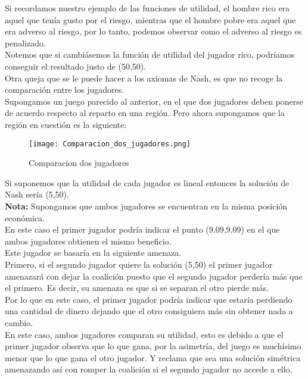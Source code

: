\documentclass[10pt,a4paper]{book}
\begin{document}
Si recordamos nuestro ejemplo de las funciones de utilidad, el hombre rico era aquel que tenía gusto por el riesgo, mientras que el hombre pobre era aquel que era adverso al riesgo, por lo tanto, podemos observar como el adverso al riesgo es penalizado.\\

Notemos que si cambiásemos la función de utilidad del jugador rico, podríamos conseguir el resultado justo de (50,50).\\

Otra queja que se le puede hacer a los axiomas de Nash, es que no recoge la comparación entre los jugadores.\\

Supongamos un juego parecido al anterior, en el que dos jugadores deben ponerse de acuerdo respecto al reparto en una región. Pero ahora supongamos que la región en cuestión es la siguiente:\\


\begin{figure}[htb]
\centering
\texttt{[image: Comparacion\_dos\_jugadores.png]}
\caption{Comparacion dos jugadores}
\end{figure}


	
Si suponemos que la utilidad de cada jugador es lineal entonces la solución de Nash sería (5,50).\\

\textbf{Nota:} Supongamos que ambos jugadores se encuentran en la misma posición económica.\\

En este caso el primer jugador podría indicar el punto (9.09,9.09) en el que ambos jugadores obtienen el mismo beneficio.\\

Este jugador se basaría en la siguiente amenaza. \\
Primero, si el segundo jugador quiere la solución (5,50) el primer jugador amenazará con dejar la coalición puesto que el segundo jugador perdería más que el primero. Es decir, su amenaza es que si se separan el otro pierde más.\\

Por lo que en este caso, el primer jugador podría indicar que estaría perdiendo una cantidad de dinero dejando que el otro consiguiera más sin obtener nada a cambio.\\

En este caso, ambos jugadores comparan su utilidad, esto es debido a que el primer jugador observa que lo que gana, por la asimetría, del juego es muchísimo menor que lo que gana el otro jugador. Y reclama que sea una solución simétrica amenazando así con romper la coalición si el segundo jugador no accede a ello.\\
 
\end{document}

